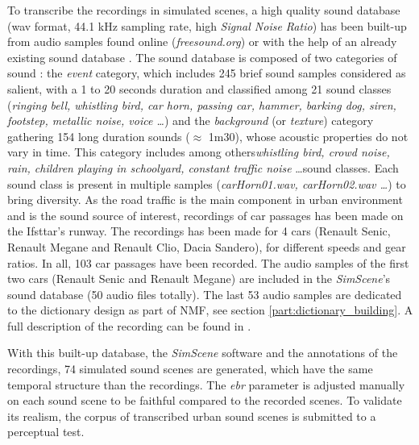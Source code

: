 \documentclass[review,5p,twocolumn,sort&compress,times]{elsarticle}
\begin{document}
To transcribe the recordings in simulated scenes, a high quality sound database (wav format, 44.1 kHz sampling rate, high \textit{Signal Noise Ratio}) has been built-up from audio samples found online (\textit{freesound.org}) or with the help of an already existing sound database \cite{salamon2014dataset}. The sound database is composed of two categories of sound : the \textit{event} category, which includes 245 brief sound samples considered as salient, with a 1 to 20 seconds duration and classified among 21 sound classes (\textit{ringing bell, whistling bird, car horn, passing car, hammer, barking dog, siren, footstep, metallic noise, voice \dots}) and the \textit{background} (or \textit{texture}) category gathering 154 long duration sounds ($\approx$ 1m30), whose acoustic properties do not vary in time. This category includes among others\textit{whistling bird, crowd noise, rain, children playing in schoolyard, constant traffic noise} \dots sound classes. Each sound class is present in multiple samples (\textit{carHorn01.wav, carHorn02.wav \dots}) to bring diversity.
As the road traffic is the main component in urban environment and is the sound source of interest, recordings of car passages has been made on the Ifsttar's runway. The recordings has been made for 4 cars (Renault Senic, Renault Megane and Renault Clio, Dacia Sandero),  for different speeds and gear ratios. In all, 103 car passages have been recorded. The audio samples of the first two cars (Renault Senic and Renault Megane) are included in the \textit{SimScene}'s sound database (50 audio files totally). The last 53 audio samples are dedicated to the dictionary design as part of NMF, see section \ref{part:dictionary_building}. A full description of the recording can be found in \cite{gloaguen_creation_2017}.

With this built-up database, the \textit{SimScene} software and the annotations of the recordings, 74 simulated sound scenes are generated, which have the same temporal structure than the recordings. The \textit{ebr} parameter is adjusted manually on each sound scene to be faithful compared to the recorded scenes. To validate its realism, the corpus of transcribed urban sound scenes is submitted to a perceptual test.
\end{document}

